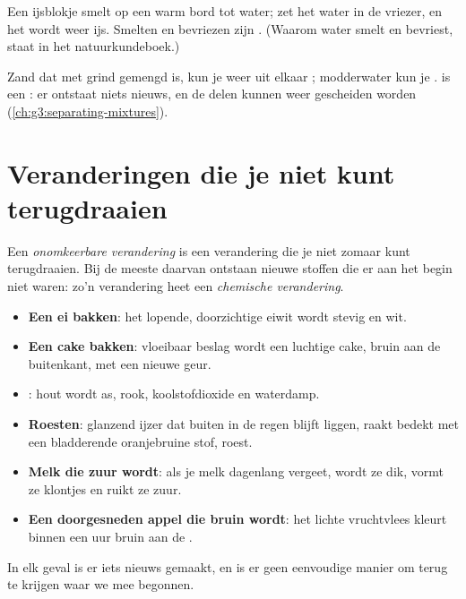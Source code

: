 \begin{example}\label{ex:g5:irreversible-changes:ice}
Een ijsblokje smelt op een warm bord tot water; zet het water in de
vriezer, en het wordt weer ijs. Smelten en bevriezen zijn . (Waarom water smelt en bevriest, staat in het
natuurkundeboek.)
\end{example}

\begin{example}[Mengen]\label{ex:g5:irreversible-changes:mix}
Zand dat met grind gemengd is, kun je weer uit elkaar ; modderwater
kun je .  is een : er ontstaat niets
nieuws, en de delen kunnen weer gescheiden worden
(\cref{ch:g3:separating-mixtures}).
\end{example}

\section{Veranderingen die je niet kunt terugdraaien}

\begin{definition}\label{def:g5:irreversible-changes:chemical-change}
Een \emph{onomkeerbare verandering} is
een verandering die je niet zomaar kunt terugdraaien. Bij de meeste
daarvan ontstaan nieuwe stoffen die er aan het begin niet waren: zo'n
verandering heet een \emph{chemische verandering}.
\end{definition}

\begin{example}\label{ex:g5:irreversible-changes:six}
\begin{itemize}
  \item \textbf{Een ei bakken}: het lopende, doorzichtige eiwit wordt
        stevig en wit.
  \item \textbf{Een cake bakken}: vloeibaar beslag wordt een luchtige
        cake, bruin aan de buitenkant, met een nieuwe geur.
  \item \textbf{}: hout wordt as, rook, koolstofdioxide en
        waterdamp.
  \item \textbf{Roesten}: glanzend ijzer dat buiten in de regen blijft
        liggen, raakt bedekt met een bladderende oranjebruine stof, roest.
  \item \textbf{Melk die zuur wordt}: als je melk dagenlang vergeet,
        wordt ze dik, vormt ze klontjes en ruikt ze zuur.
  \item \textbf{Een doorgesneden appel die bruin wordt}: het lichte
        vruchtvlees kleurt binnen een uur bruin aan de .
\end{itemize}
In elk geval is er iets nieuws gemaakt, en is er geen eenvoudige manier
om terug te krijgen waar we mee begonnen.
\end{example}

